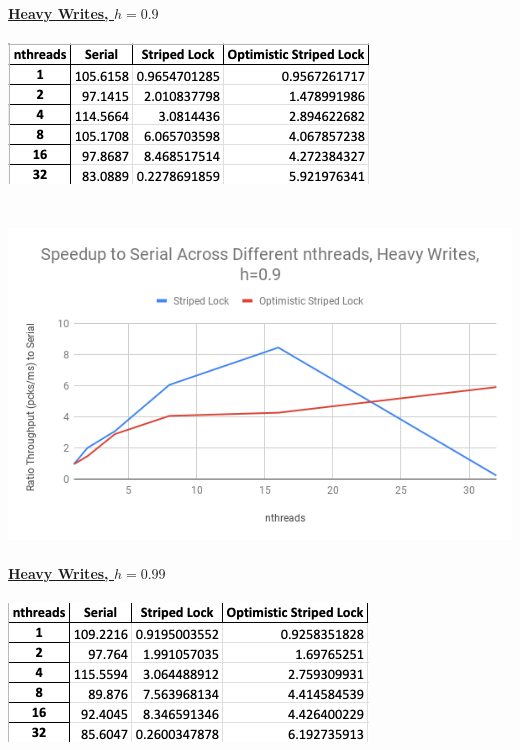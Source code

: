 \documentclass{article}
\begin{document}
\begin{adjustwidth}{-2cm}{-2cm}
\underline{\textbf{Heavy Writes, $h=0.9$}}\\
\null\\
\includegraphics[width=\linewidth]{e3_45_9_data.png}\\ \null\\
\null\\
\includegraphics[width=\linewidth]{e3_45_9_graph.png}\\ \null\\
\underline{\textbf{Heavy Writes, $h=0.99$}}\\
\null\\
\includegraphics[width=\linewidth]{e3_45_99_data.png}\\ \null\\
\null\\

\end{adjustwidth}
\end{document}
